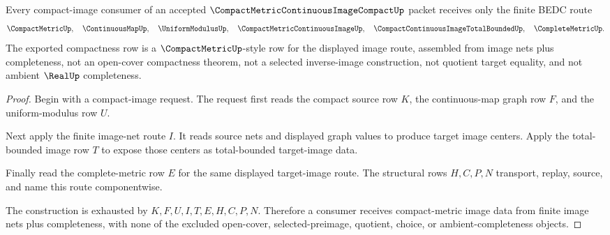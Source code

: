 \begin{theorem}
\label{thm:compact-metric-continuous-image-compact-route}
Every compact-image consumer of an accepted $\CompactMetricContinuousImageCompactUp$ packet receives only the finite BEDC route
$$
\CompactMetricUp,\quad
\ContinuousMapUp,\quad
\UniformModulusUp,\quad
\CompactMetricContinuousImageUp,\quad
\CompactContinuousImageTotalBoundedUp,\quad
\CompleteMetricUp .
$$
The exported compactness row is a $\CompactMetricUp$-style row for the displayed image route, assembled from image nets plus completeness, not an open-cover compactness theorem, not a selected inverse-image construction, not quotient target equality, and not ambient $\RealUp$ completeness.
\end{theorem}
\begin{proof}
Begin with a compact-image request. The request first reads the compact source row $K$, the continuous-map graph row $F$, and the uniform-modulus row $U$.

Next apply the finite image-net route $I$. It reads source nets and displayed graph values to produce target image centers. Apply the total-bounded image row $T$ to expose those centers as total-bounded target-image data.

Finally read the complete-metric row $E$ for the same displayed target-image route. The structural rows $H,C,P,N$ transport, replay, source, and name this route componentwise.

The construction is exhausted by $K,F,U,I,T,E,H,C,P,N$. Therefore a consumer receives compact-metric image data from finite image nets plus completeness, with none of the excluded open-cover, selected-preimage, quotient, choice, or ambient-completeness objects.
\end{proof}

\begin{closurestatus}{\CompactMetricContinuousImageCompactUp}
  \theoryclosure{\seedClosure}
  \formalstatus{\unformalizedV}
\end{closurestatus}

